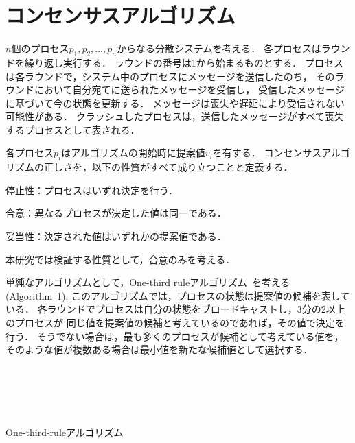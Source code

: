 \documentclass[technicalreport]{ieicej}
\theoremstyle{plain}
\begin{document}
\section{コンセンサスアルゴリズム}\label{sec:consensus}

$n$個のプロセス$p_1, p_2, \ldots, p_n$からなる分散システムを考える．
各プロセスはラウンドを繰り返し実行する．
ラウンドの番号は1から始まるものとする．
プロセスは各ラウンドで，システム中のプロセスにメッセージを送信したのち，
そのラウンドにおいて自分宛てに送られたメッセージを受信し，
受信したメッセージに基づいて今の状態を更新する．
メッセージは喪失や遅延により受信されない可能性がある．
クラッシュしたプロセスは，送信したメッセージがすべて喪失するプロセスとして表される．

各プロセス$p_i$はアルゴリズムの開始時に提案値$v_i$を有する．
コンセンサスアルゴリズムの正しさを，以下の性質がすべて成り立つことと定義する．

停止性：プロセスはいずれ決定を行う．

合意：異なるプロセスが決定した値は同一である．

妥当性：決定された値はいずれかの提案値である．

本研究では検証する性質として，合意のみを考える．


単純なアルゴリズムとして，One-third ruleアルゴリズム~\cite{HOjournal}を考える(Algorithm~1). 
このアルゴリズムでは，プロセスの状態は提案値の候補を表している．
各ラウンドでプロセスは自分の状態をブロードキャストし，3分の2以上のプロセスが
同じ値を提案値の候補と考えているのであれば，その値で決定を行う．
そうでない場合は，最も多くのプロセスが候補として考えている値を，
そのような値が複数ある場合は最小値を新たな候補値として選択する．
\begin{algorithm}[ht]
    \normalsize{
        \begin{distribalgo}[1]
           
             \\ 
            \ENDINDENT 
            \BLANK
            
             \\
             \\
{}
\ENDIF
            \ENDIF

            \ENDINDENT
            \caption{One-third-ruleアルゴリズム}
            \label{algo:bakery}
        \end{distribalgo}
    }
\end{algorithm}
\end{document}
